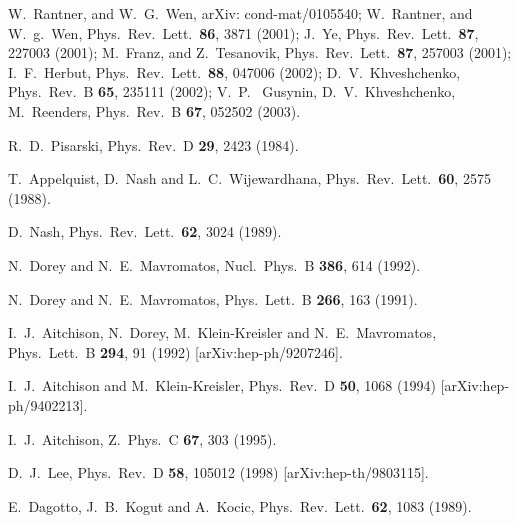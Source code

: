 \documentclass[12pt,a4paper]{article} \usepackage[latin1] {inputenc}
\begin{document}
\begin{thebibliography}{bib}
 W.~Rantner, and W.~G.~Wen, arXiv: cond-mat/0105540;
  W.~Rantner, and W.~g.~Wen, Phys.\ Rev.\ Lett.\ {\bf 86}, 3871
  (2001); J.~Ye, Phys.\ Rev.\ Lett.\ {\bf 87}, 227003 (2001);
  M.~Franz, and Z.~Tesanovik, Phys.\ Rev.\ Lett.\ {\bf 87}, 257003
  (2001); I.~F.~Herbut, Phys.\ Rev.\ Lett.\ {\bf 88}, 047006 (2002);
  D.~V.~Khveshchenko, Phys.\ Rev.\ B {\bf 65}, 235111 (2002); V.~P.~
  Gusynin, D.~V.~Khveshchenko, M.~Reenders, Phys.\ Rev.\ B {\bf 67},
  052502 (2003).

 R.~D.~Pisarski,
  Phys.\ Rev.\ D {\bf 29}, 2423 (1984).

 T.~Appelquist, D.~Nash and
  L.~C.~Wijewardhana,
  Phys.\ Rev.\ Lett.\ {\bf 60}, 2575 (1988).

 D.~Nash,
  Phys.\ Rev.\ Lett.\ {\bf 62}, 3024 (1989).

 N.~Dorey and N.~E.~Mavromatos,
  Nucl.\ Phys.\ B {\bf 386}, 614 (1992).

 N.~Dorey and N.~E.~Mavromatos,
  Phys.\ Lett.\ B {\bf 266}, 163 (1991).

 I.~J.~Aitchison, N.~Dorey,
  M.~Klein-Kreisler and N.~E.~Mavromatos,
  Phys.\ Lett.\ B {\bf 294}, 91 (1992) [arXiv:hep-ph/9207246].

 I.~J.~Aitchison and M.~Klein-Kreisler,
  Phys.\ Rev.\ D {\bf 50}, 1068 (1994) [arXiv:hep-ph/9402213].

 I.~J.~Aitchison,
  Z.\ Phys.\ C {\bf 67}, 303 (1995).

 D.~J.~Lee,
  Phys.\ Rev.\ D {\bf 58}, 105012 (1998) [arXiv:hep-th/9803115].

 E.~Dagotto, J.~B.~Kogut and A.~Kocic,
  Phys.\ Rev.\ Lett.\ {\bf 62}, 1083 (1989).


\end{thebibliography}
\end{document}
